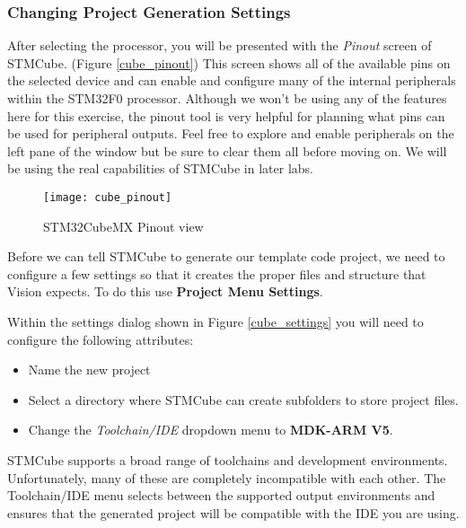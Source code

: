 \documentclass[11pt,fleqn]{book} %
\begin{document}
\subsubsection*{Changing Project Generation Settings}

After selecting the processor, you will be presented with the \textit{Pinout} screen of STMCube. (Figure \vref{cube_pinout}) This screen shows all of the available pins on the selected device and can enable and configure many of the internal peripherals within the STM32F0 processor. Although we won't be using any of the features here for this exercise, the pinout tool is very helpful for planning what pins can be used for peripheral outputs. Feel free to explore and enable peripherals on the left pane of the window but be sure to clear them all before moving on. We will be using the real capabilities of STMCube in later labs.

\begin{figure}[h!]
	\centering\texttt{[image: cube\_pinout]}
	\caption{STM32CubeMX Pinout view}
	\label{cube_pinout}
\end{figure}

Before we can tell STMCube to generate our template code project, we need to configure a few settings so that it creates the proper files and structure that {\textmu}Vision expects. To do this use \textbf{Project Menu \textrightarrow Settings}. 

Within the settings dialog shown in Figure \vref{cube_settings} you will need to configure the following attributes:
\begin{itemize}
	\item Name the new project
	\item Select a directory where STMCube can create subfolders to store project files.
	\item Change the \textit{Toolchain/IDE} dropdown menu to \textbf{MDK-ARM V5}.
\end{itemize}

STMCube supports a broad range of toolchains and development environments. Unfortunately, many of these are completely incompatible with each other. The Toolchain/IDE menu selects between the supported output environments and ensures that the generated project will be compatible with the IDE you are using. 
\end{document}
